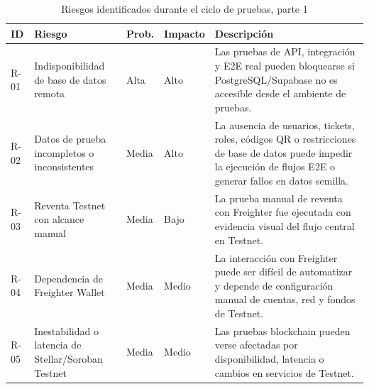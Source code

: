 \documentclass[12pt,letterpaper]{article}
\begin{document}
\begin{table}[H]
\centering
\begingroup
\scriptsize
\setlength{\tabcolsep}{2.5pt}
\renewcommand{\arraystretch}{1.18}

\begin{tabularx}{\textwidth}{|
>{\centering\arraybackslash}p{1.1cm}|
>{\raggedright\arraybackslash}p{3.4cm}|
>{\centering\arraybackslash}p{1.8cm}|
>{\centering\arraybackslash}p{1.6cm}|
>{\raggedright\arraybackslash}X|}
\hline
\textbf{ID} & \textbf{Riesgo} & \textbf{Prob.} & \textbf{Impacto} & \textbf{Descripción} \\
\hline
R-01 & Indisponibilidad de base de datos remota & Alta & Alto & Las pruebas de API, integración y E2E real pueden bloquearse si PostgreSQL/Supabase no es accesible desde el ambiente de pruebas. \\
\hline
R-02 & Datos de prueba incompletos o inconsistentes & Media & Alto & La ausencia de usuarios, tickets, roles, códigos QR o restricciones de base de datos puede impedir la ejecución de flujos E2E o generar fallos en datos semilla. \\
\hline
R-03 & Reventa Testnet con alcance manual & Media & Bajo & La prueba manual de reventa con Freighter fue ejecutada con evidencia visual del flujo central en Testnet. \\
\hline
R-04 & Dependencia de Freighter Wallet & Media & Medio & La interacción con Freighter puede ser difícil de automatizar y depende de configuración manual de cuentas, red y fondos de Testnet. \\
\hline
R-05 & Inestabilidad o latencia de Stellar/Soroban Testnet & Media & Medio & Las pruebas blockchain pueden verse afectadas por disponibilidad, latencia o cambios en servicios de Testnet. \\
\hline
\end{tabularx}

\endgroup
\caption{Riesgos identificados durante el ciclo de pruebas, parte 1}
\label{tab:riesgos-identificados-1}
\end{table}
\end{document}
